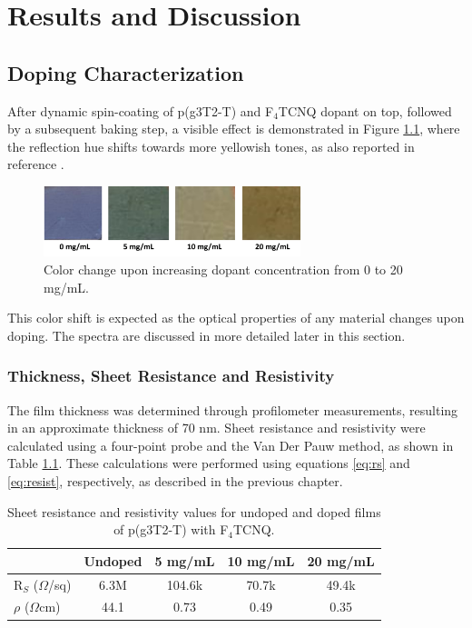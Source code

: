 \chapter{Results and Discussion} \label{cha:3}

\section{Doping Characterization}

After dynamic spin-coating of p(g3T2-T) and F$_{4}$TCNQ dopant on top, followed by a subsequent baking step, a visible effect is demonstrated in Figure \ref{fig:color}, where the reflection hue shifts towards more yellowish tones, as also reported in reference \cite{tanTuningOrganicElectrochemical2022}. 

\begin{figure}[ht]
  \centering
  \includegraphics[width=7.5cm]{Images/pdf/doping_color.pdf}
  \caption[Color shift upon doping level increase]{Color change upon increasing dopant concentration from 0 to 20 mg/mL.
  \label{fig:color}}
\end{figure}

This color shift is expected as the optical properties of any material changes upon doping. The spectra are discussed in more detailed later in this section.

\subsection{Thickness, Sheet Resistance and Resistivity}

The film thickness was determined through profilometer measurements, resulting in an approximate thickness of 70 nm. Sheet resistance and resistivity were calculated using a four-point probe and the Van Der Pauw method, as shown in Table \ref{tab:res}. These calculations were performed using equations \ref{eq:rs} and \ref{eq:resist}, respectively, as described in the previous chapter. 

\begin{table}[ht]
\centering
\caption{Sheet resistance and resistivity values for undoped and doped films of p(g3T2-T) with F$_{4}$TCNQ.}
\begin{tabular}{l|c|c|c|c}
& Undoped & 5 mg/mL & 10 mg/mL & 20 mg/mL \\\hline
R$_{S}$ ($\Omega$/sq) & 6.3M & 104.6k & 70.7k & 49.4k\\
$\rho$ ($\Omega$cm) & 44.1 & 0.73 & 0.49 & 0.35\\\hline
\end{tabular}
\label{tab:res}
\end{table}


